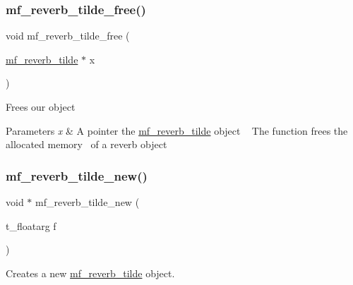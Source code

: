 \subsubsection{\texorpdfstring{mf\+\_\+reverb\+\_\+tilde\+\_\+free()}{mf\_reverb\_tilde\_free()}}
{\footnotesize\ttfamily void mf\+\_\+reverb\+\_\+tilde\+\_\+free (\begin{DoxyParamCaption}\item[{\mbox{\hyperlink{structmf__reverb__tilde}{mf\+\_\+reverb\+\_\+tilde}} $\ast$}]{x }\end{DoxyParamCaption})\hspace{0.3cm}{\ttfamily [related]}}



Frees our object~\newline
 


\begin{DoxyParams}{Parameters}
{\em x} & A pointer the \mbox{\hyperlink{structmf__reverb__tilde}{mf\+\_\+reverb\+\_\+tilde}} object ~\newline
 The function frees the allocated memory~\newline
 of a reverb object \\
\hline
\end{DoxyParams}
\mbox{\label{structmf__reverb__tilde_a2b9bdb881d12c73657e4b21151c5ab2c}} 
\subsubsection{\texorpdfstring{mf\+\_\+reverb\+\_\+tilde\+\_\+new()}{mf\_reverb\_tilde\_new()}}
{\footnotesize\ttfamily void $\ast$ mf\+\_\+reverb\+\_\+tilde\+\_\+new (\begin{DoxyParamCaption}\item[{t\+\_\+floatarg}]{f }\end{DoxyParamCaption})\hspace{0.3cm}{\ttfamily [related]}}



Creates a new \mbox{\hyperlink{structmf__reverb__tilde}{mf\+\_\+reverb\+\_\+tilde}} object.~\newline
 


